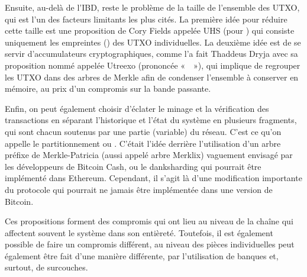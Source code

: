Ensuite, au-delà de l'IBD, reste le problème de la taille de l'ensemble des UTXO, qui est l'un des facteurs limitants les plus cités. La première idée pour réduire cette taille est une proposition de Cory Fields appelée UHS (pour ) qui consiste uniquement les empreintes () des UTXO individuelles. La deuxième idée est de se servir d'accumulateurs cryptographiques, comme l'a fait Thaddeus Dryja avec sa proposition nommé appelée Utreexo (prononcée «~~»), qui implique de regrouper les UTXO dans des arbres de Merkle afin de condenser l'ensemble à conserver en mémoire, au prix d'un compromis sur la bande passante.


Enfin, on peut également choisir d'éclater le minage et la vérification des transactions en séparant l'historique et l'état du système en plusieurs fragments, qui sont chacun soutenus par une partie (variable) du réseau. C'est ce qu'on appelle le partitionnement ou . C'était l'idée derrière l'utilisation d'un arbre préfixe de Merkle-Patricia (aussi appelé arbre Merklix) vaguement envisagé par les développeurs de Bitcoin Cash, ou le danksharding qui pourrait être implémenté dans Ethereum. Cependant, il s'agit là d'une modification importante du protocole qui pourrait ne jamais être implémentée dans une version de Bitcoin.

%
Ces propositions forment des compromis qui ont lieu au niveau de la chaîne qui affectent souvent le système dans son entièreté. Toutefois, il est également possible de faire un compromis différent, au niveau des pièces individuelles peut également être fait d'une manière différente, par l'utilisation de banques et, surtout, de surcouches.


